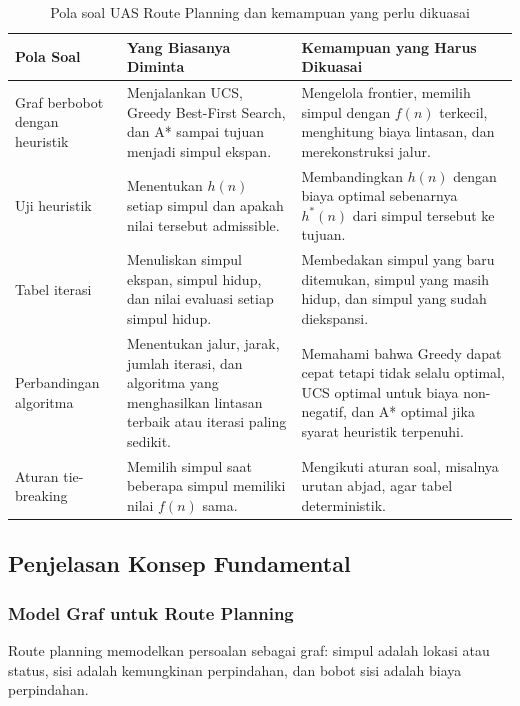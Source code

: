 \begin{table}[H]
\centering
\small
\begin{tabularx}{\textwidth}{|L{0.22\textwidth}|X|X|}
\hline
\textbf{Pola Soal} & \textbf{Yang Biasanya Diminta} & \textbf{Kemampuan yang Harus Dikuasai} \\
\hline
Graf berbobot dengan heuristik & Menjalankan UCS, Greedy Best-First Search, dan A* sampai tujuan menjadi simpul ekspan. & Mengelola frontier, memilih simpul dengan $f(n)$ terkecil, menghitung biaya lintasan, dan merekonstruksi jalur. \\
\hline
Uji heuristik & Menentukan $h(n)$ setiap simpul dan apakah nilai tersebut admissible. & Membandingkan $h(n)$ dengan biaya optimal sebenarnya $h^*(n)$ dari simpul tersebut ke tujuan. \\
\hline
Tabel iterasi & Menuliskan simpul ekspan, simpul hidup, dan nilai evaluasi setiap simpul hidup. & Membedakan simpul yang baru ditemukan, simpul yang masih hidup, dan simpul yang sudah diekspansi. \\
\hline
Perbandingan algoritma & Menentukan jalur, jarak, jumlah iterasi, dan algoritma yang menghasilkan lintasan terbaik atau iterasi paling sedikit. & Memahami bahwa Greedy dapat cepat tetapi tidak selalu optimal, UCS optimal untuk biaya non-negatif, dan A* optimal jika syarat heuristik terpenuhi. \\
\hline
Aturan tie-breaking & Memilih simpul saat beberapa simpul memiliki nilai $f(n)$ sama. & Mengikuti aturan soal, misalnya urutan abjad, agar tabel deterministik. \\
\hline
\end{tabularx}
\caption{Pola soal UAS Route Planning dan kemampuan yang perlu dikuasai}
\label{tab:pola-soal-route-planning}
\end{table}

\subsection{Penjelasan Konsep Fundamental}

\subsubsection{Model Graf untuk Route Planning}

\begin{jawab}
Route planning memodelkan persoalan sebagai graf: simpul adalah lokasi atau status, sisi adalah kemungkinan perpindahan, dan bobot sisi adalah biaya perpindahan.
\end{jawab}

